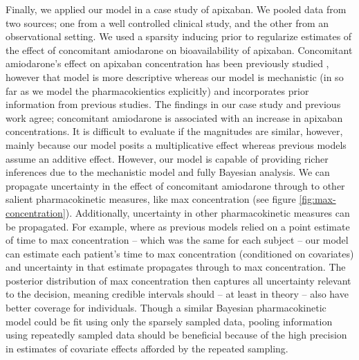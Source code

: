 Finally, we applied our model in a case study of apixaban.  We pooled data from two sources; one from a well controlled clinical study, and the other from an observational setting.  We used a sparsity inducing prior to regularize estimates of the effect of concomitant amiodarone on bioavailability of apixaban.  Concomitant amiodarone's effect on apixaban concentration has been previously studied \cite{gulilat2020drug}, however that model is more descriptive whereas our model is mechanistic (in so far as we model the pharmacokientics explicitly) and incorporates prior information from previous studies.  The findings in our case study and previous work agree; concomitant amiodarone is associated with an increase in apixaban concentrations. It is difficult to evaluate if the magnitudes are similar, however, mainly because our model posits a multiplicative effect whereas previous models assume an additive effect.  However, our model is capable of providing richer inferences due to the mechanistic model and fully Bayesian analysis.  We can propagate uncertainty in the effect of concomitant amiodarone through to other salient pharmacokinetic measures, like max concentration (see figure \ref{fig:max-concentration}).  Additionally, uncertainty in other pharmacokinetic measures can be propagated. For example, where as previous models relied on a point estimate of time to max concentration -- which was the same for each subject -- our model can estimate each patient's time to max concentration (conditioned on covariates) and uncertainty in that estimate propagates through to max concentration.  The posterior distribution of max concentration then captures all uncertainty relevant to the decision, meaning credible intervals should -- at least in theory -- also have better coverage for individuals.  Though a similar Bayesian pharmacokinetic model could be fit using only the sparsely sampled data, pooling information using repeatedly sampled data should be beneficial because of the high precision in estimates of covariate effects afforded by the repeated sampling.

